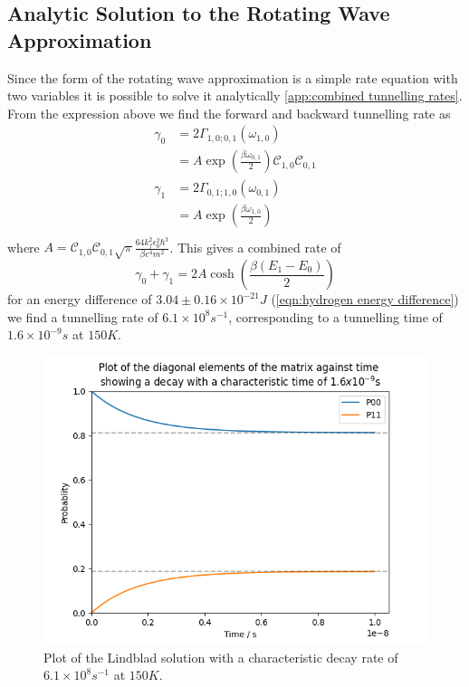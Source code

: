 \subsection{Analytic Solution to the Rotating Wave Approximation}
Since the form of the rotating
wave approximation is a simple
rate equation with two variables
it is possible to solve it analytically
\cref{app:combined tunnelling rates}.
From the expression above we find the
forward and backward tunnelling rate as
\begin{align}
    \gamma_0 & = 2\Gamma_{1,0;0, 1}(\omega_{1,0})       \\
             & = A \exp{(\frac{\beta \omega_{0,1}}{2})}
    \mathcal{C}_{1,0} \mathcal{C}_{0,1}                 \\
    \gamma_1 & = 2\Gamma_{0,1;1, 0}(\omega_{0,1})       \\
             & = A \exp{(\frac{\beta \omega_{1,0}}{2})} \\
\end{align}
where
\(A =
\mathcal{C}_{1,0} \mathcal{C}_{0,1}
\sqrt{\pi}
\frac{64 k_f^2 \epsilon_0^2 \hbar^3}{\beta e^4 m^2}\).
This gives a combined rate of
\begin{equation}
    \gamma_0 + \gamma_1 = 2A\cosh{(\frac{\beta (E_1 - E_0)}{2})}
    \label{eqn:theoretical rate lindblad equation}
\end{equation}
for an energy difference of
\(3.04\pm0.16\times{}10^{-21} J\)
(\cref{eqn:hydrogen energy difference})
we find a tunnelling rate of
\(6.1\times{}10^{8}s^{-1}\),
corresponding to a
tunnelling time of
\(1.6\times{}10^{-9}s\) at
\(150K\).


\begin{figure}
    \centering
    \includegraphics[width=.5\linewidth]{Figures/Redfield/Plot of lindblad solution.png}
    \caption{Plot of the Lindblad solution with a characteristic decay
    rate of \(6.1\times{}10^{8}s^{-1}\) at
    \(150K\).
    }\label{fig:two site lindblad soluton}
\end{figure}



